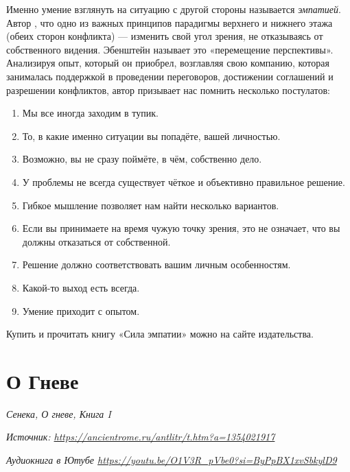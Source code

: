 Именно умение взглянуть на ситуацию с другой стороны называется \textit{эмпатией}. Автор , что одно из важных принципов парадигмы верхнего и нижнего этажа (обеих сторон конфликта) --- изменить свой угол зрения, не отказываясь от собственного видения. Эбенштейн называет это «перемещение перспективы». Анализируя опыт, который он приобрел, возглавляя свою компанию, которая занималась поддержкой в проведении переговоров, достижении соглашений и разрешении конфликтов, автор призывает нас помнить несколько постулатов:

\begin{enumerate}
    \item Мы все иногда заходим в тупик.
    \item То, в какие именно  ситуации вы попадёте,  вашей личностью.
    \item Возможно, вы не сразу поймёте, в чём, собственно дело.
    \item У проблемы не всегда существует чёткое и объективно правильное решение.
    \item Гибкое мышление позволяет нам найти несколько вариантов.
    \item Если вы принимаете на время чужую точку зрения, это не означает, что вы должны отказаться от собственной.
    \item Решение должно соответствовать вашим личным особенностям.
    \item Какой-то выход есть всегда.
    \item Умение приходит с опытом.
\end{enumerate}

Купить и прочитать книгу «Сила эмпатии» можно на сайте издательства.

\clearpage

\section{О Гневе}

\textit{Сенека, О гневе, Книга I}

\textit{Источник: \url{https://ancientrome.ru/antlitr/t.htm?a=1354021917}}

\textit{Аудиокнига в Ютубе \url{https://youtu.be/O1V3R_pVbe0?si=ByPpBX1xvSbkylD9}}


